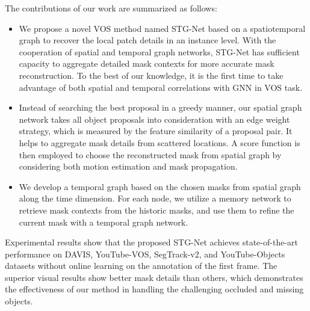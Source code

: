 \documentclass[letterpaper]{article} %
\begin{document}
The contributions of our work are summarized as follows:
\begin{itemize}
    \item We propose a novel VOS method named STG-Net based on a spatiotemporal graph to recover the local patch details in an instance level. With the cooperation of spatial and temporal graph networks, STG-Net has sufficient capacity to aggregate detailed mask contexts for more accurate mask reconstruction. To the best of our knowledge, it is the first time to take advantage of both spatial and temporal correlations with GNN in VOS task.
    \item 
    Instead of searching the best proposal in a greedy manner, our spatial graph network takes all object proposals into consideration with an edge weight strategy, which is measured by the feature similarity of a proposal pair. It helps to aggregate mask details from scattered locations. A score function is then employed to choose the reconstructed mask from spatial graph by considering both motion estimation and mask propagation.
    \item We develop a temporal graph based on the chosen masks from spatial graph along the time dimension. For each node, we utilize a memory network to retrieve mask contexts from the historic masks, and use them to refine the current mask with a temporal graph network.
\end{itemize}

Experimental results show that the proposed STG-Net achieves state-of-the-art performance on DAVIS, YouTube-VOS, SegTrack-v2, and YouTube-Objects datasets without online learning on the annotation of the first frame. The superior visual results show better mask details than others, which demonstrates the effectiveness of our method in handling the challenging occluded and missing objects.
\end{document}
